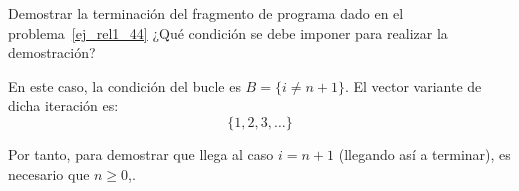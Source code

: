 \begin{ejercicio}
\end{ejercicio}

\begin{ejercicio}
    Demostrar la terminación del fragmento de programa dado en el problema~\ref{ej_rel1_44} ¿Qué condición se debe imponer para realizar la demostración?
    
    En este caso, la condición del bucle es $B=\{i\neq n+1\}$. El vector variante de dicha iteración es:
    \begin{equation*}
        \{1,2,3,\ldots\}
    \end{equation*}

    Por tanto, para demostrar que llega al caso $i=n+1$ (llegando así a terminar), es necesario que $n\geq 0$,.
\end{ejercicio}

